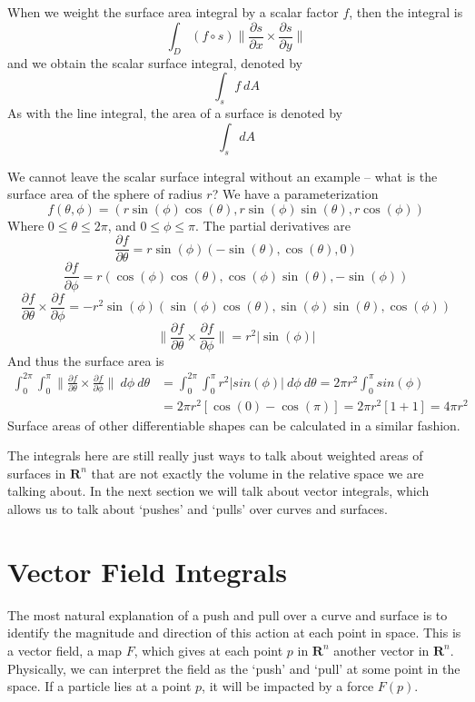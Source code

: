 \documentclass[12pt]{amsbook}
\theoremstyle{plain}
\theoremstyle{definition}
\begin{document}
When we weight the surface area integral by a scalar factor $f$, then the integral is
%
\[ \int_D (f \circ s) \bigg\| \frac{\partial s}{\partial x} \times \frac{\partial s}{\partial y} \bigg\| \]
%
and we obtain the scalar surface integral, denoted by
%
\[ \int_s f\ dA \]
%
As with the line integral, the area of a surface is denoted by
%
\[ \int_s dA \]

We cannot leave the scalar surface integral without an example -- what is the surface area of the sphere of radius $r$? We have a parameterization
%
\[ f(\theta, \phi) = (r\sin(\phi)\cos(\theta), r\sin(\phi)\sin(\theta), r\cos(\phi)) \]
%
Where $0 \leq \theta \leq 2\pi$, and $0 \leq \phi \leq \pi$. The partial derivatives are
%
\[ \frac{\partial f}{\partial \theta} = r\sin(\phi)(-\sin(\theta), \cos(\theta), 0) \]
%
\[ \frac{\partial f}{\partial \phi} = r(\cos(\phi)\cos(\theta), \cos(\phi)\sin(\theta), -\sin(\phi)) \]
%
\[ \frac{\partial f}{\partial \theta} \times \frac{\partial f}{\partial \phi} = -r^2 \sin(\phi)(\sin(\phi)\cos(\theta), \sin(\phi)\sin(\theta), \cos(\phi)) \]
%
\[ \bigg\|\frac{\partial f}{\partial \theta} \times \frac{\partial f}{\partial \phi} \bigg\| = r^2 |\sin(\phi)| \]
%
And thus the surface area is
%
\begin{align*}
    \int_0^{2\pi} \int_0^\pi \bigg\|\frac{\partial f}{\partial \theta} \times \frac{\partial f}{\partial \phi} \bigg\|\ d\phi\ d\theta &= \int_0^{2\pi} \int_0^\pi r^2 |sin(\phi)|\ d\phi\ d\theta = 2\pi r^2 \int_0^\pi sin(\phi)\\
    &= 2\pi r^2 [\cos(0) - \cos(\pi)] = 2\pi r^2 [1 + 1] = 4\pi r^2
\end{align*}
%
Surface areas of other differentiable shapes can be calculated in a similar fashion.

The integrals here are still really just ways to talk about weighted areas of surfaces in $\mathbf{R}^n$ that are not exactly the volume in the relative space we are talking about. In the next section we will talk about vector integrals, which allows us to talk about `pushes' and `pulls' over curves and surfaces.


\section{Vector Field Integrals}

The most natural explanation of a push and pull over a curve and surface is to identify the magnitude and direction of this action at each point in space. This is a vector field, a map $F$, which gives at each point $p$ in $\mathbf{R}^n$ another vector in $\mathbf{R}^n$. Physically, we can interpret the field as the `push' and `pull' at some point in the space. If a particle lies at a point $p$, it will be impacted by a force $F(p)$.
\end{document}
